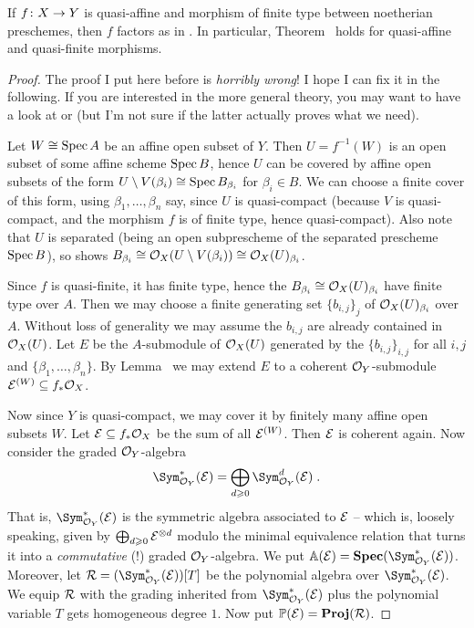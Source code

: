 \documentclass[a4paper,parskip=half,numbers=enddot, DIV=12]{scrreprt}
\renewcommand{\geq}{\geqslant}
\begin{document}
\begin{lem}
	If $f\colon X\morphism Y$ is quasi-affine and morphism of finite type between noetherian preschemes, then $f$ factors as in . In particular,  Theorem~ holds for quasi-affine and quasi-finite morphisms.
\end{lem}
\begin{proof}
	The proof I put here before is \emph{horribly wrong}! I hope I can fix it in the following. If you are interested in the more general theory, you may want to have a look at \cite[\S5]{egaII} or \cite[]{stacks-project} (but I'm not sure if the latter actually proves what we need).
	
	Let $W\cong \operatorname{Spec} A$ be an affine open subset of $Y$. Then $U=f^{-1}(W)$ is an open subset of some affine scheme $\operatorname{Spec} B$, hence $U$ can be covered by affine open subsets of the form $U\setminus V(\beta_i)\cong \operatorname{Spec} B_{\beta_i}$ for $\beta_i\in B$. We can choose a finite cover of this form, using $\beta_1,\ldots,\beta_n$ say, since $U$ is quasi-compact (because $V$ is quasi-compact, and the morphism $f$ is 
	of finite type, hence quasi-compact). Also note that $U$ is separated (being an open subprescheme of the separated prescheme $\operatorname{Spec} B$), so \cite[Proposition~1.5.1]{alggeo1} shows $B_{\beta_i}\cong \mathcal{O}_X(U\setminus V(\beta_i))\cong \mathcal{O}_X(U)_{\beta_i}$.
	
	Since $f$ is quasi-finite, it has finite type, hence the $B_{\beta_i}\cong \mathcal{O}_X(U)_{\beta_i}$ have finite type over $A$. Then we may choose a finite generating set $\{b_{i,j}\}_j$ of $\mathcal{O}_X(U)_{\beta_i}$ over $A$. Without loss of generality we may assume the $b_{i,j}$ are already contained in $\mathcal{O}_X(U)$. Let $E$ be the $A$-submodule of $\mathcal{O}_X(U)$ generated by the $\{b_{i,j}\}_{i,j}$ for all $i,j$ and $\{\beta_1,\ldots,\beta_n\}$. By Lemma~ we may extend $E$ to a coherent $\mathcal{O}_Y$-submodule $\mathcal{E}^{(W)}\subseteq f_*\mathcal{O}_X$.
	
	Now since $Y$ is quasi-compact, we may cover it by finitely many affine open subsets $W$. Let $\mathcal{E}\subseteq f_*\mathcal{O}_X$ be the sum of all $\mathcal{E}^{(W)}$. Then $\mathcal{E}$ is coherent again. Now consider the graded $\mathcal{O}_Y$-algebra
	\begin{align*}
		\Sym_{\Oo_Y}^*(\Ee)=\bigoplus_{d\geq 0}\Sym_{\Oo_Y}^d(\Ee)\;.
	\end{align*}
	That is, $\Sym_{\Oo_Y}^*(\Ee)$ is the symmetric algebra associated to $\mathcal{E}$ -- which is, loosely speaking, given by $\bigoplus_{d\geq 0}\Ee^{\otimes d}$ modulo the minimal equivalence relation that turns it into a \emph{commutative} (!) graded $\mathcal{O}_Y$-algebra. We put $\IA(\Ee)=\SPEC(\Sym_{\Oo_Y}^*(\Ee))$. Moreover, let $\Rr=(\Sym_{\Oo_Y}^*(\Ee))[T]$ be the polynomial algebra over $\Sym_{\Oo_Y}^*(\Ee)$. We equip $\mathcal{R}$ with the grading inherited from $\Sym_{\Oo_Y}^*(\Ee)$ plus the polynomial variable $T$ gets homogeneous degree $1$. Now put $\mathbb{P}(\mathcal{E})=\operatorname{\mathbf{Proj}}(\mathcal{R})$.
	

\end{proof}
\end{document}
